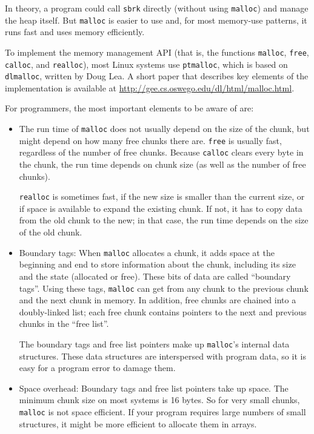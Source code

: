 \documentclass[12pt]{book}
\begin{document}
{In theory, a program could call {\tt sbrk} directly (without using
{\tt malloc}) and manage the heap itself.  But {\tt malloc} is easier
to use and, for most memory-use patterns, it runs fast and uses memory
efficiently.

To implement the memory management API (that is, the functions
{\tt malloc}, {\tt free}, {\tt calloc}, and {\tt realloc}),
most Linux systems use {\tt ptmalloc},
which is based on {\tt dlmalloc}, written by Doug Lea.  A short paper
that describes key elements of the implementation is
available at \url{http://gee.cs.oswego.edu/dl/html/malloc.html}.

For programmers, the most important elements to be aware of are:

\begin{itemize}

\item The run time of {\tt malloc} does not usually depend on the
size of the chunk, but might depend on how many free chunks there
are.  {\tt free} is usually fast, regardless of the number of
free chunks.  Because {\tt calloc} clears every byte in the chunk,
the run time depends on chunk size (as well as the number of free
chunks).

{\tt realloc} is sometimes fast, if the new size is smaller than the
current size, or if space is available to expand the existing chunk.
If not, it has to copy data from the old chunk to the new; in that
case, the run time depends on the size of the old chunk.

\item Boundary tags: When {\tt malloc} allocates a chunk, it adds
  space at the beginning and end to store information about the chunk,
  including its size and the state (allocated or free).  These bits of
  data are called ``boundary tags''.  Using these tags, {\tt malloc}
  can get from any chunk to the previous chunk and the next chunk in
  memory.  In addition, free chunks are chained into a doubly-linked
  list; each free chunk contains pointers to the next and previous
  chunks in the ``free list''.

The boundary tags and free list pointers make up {\tt malloc}'s
internal data structures.  These data structures are interspersed with
program data, so it is easy for a program error to damage them.

\item Space overhead: Boundary tags and free list pointers take up
  space.  The minimum chunk size on most systems is 16 bytes.  So for
  very small chunks, {\tt malloc} is not space efficient.  If your
  program requires large numbers of small structures, it might be more
  efficient to allocate them in arrays.


\end{itemize}}
\end{document}
